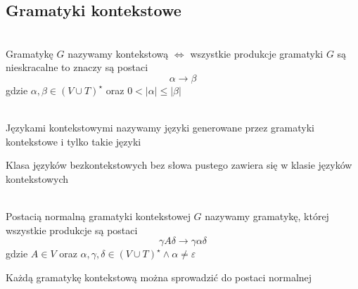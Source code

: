 \subsection{Gramatyki kontekstowe}

	\begin{df}~\\
		Gramatykę $G$ nazywamy kontekstową $\Leftrightarrow$ wszystkie produkcje gramatyki $G$ są nieskracalne
		to znaczy są postaci 
		\begin{equation}
			\alpha\rightarrow\beta
		\end{equation}
	    gdzie $\alpha,\beta\in (V\cup T)^\star$ oraz $0<|\alpha|\leqslant |\beta|$
	\end{df}			
		
	\begin{df}~\\
		Językami kontekstowymi nazywamy języki generowane przez gramatyki kontekstowe i tylko takie języki
	\end{df}	
	
	\begin{tw}
		Klasa języków bezkontekstowych bez słowa pustego zawiera się w klasie języków kontekstowych
	\end{tw}

	\begin{df}~\\
		Postacią normalną gramatyki kontekstowej $G$ nazywamy gramatykę, której wszystkie produkcje są postaci
		\begin{equation}
			\gamma A \delta \rightarrow \gamma \alpha \delta
		\end{equation}
		gdzie $A\in V$ oraz $\alpha,\gamma,\delta\in (V\cup T)^\star \wedge \alpha \neq \varepsilon$
	\end{df}
	
	\begin{lemat}
		Każdą gramatykę kontekstową można sprowadzić do postaci normalnej
	\end{lemat}
	
